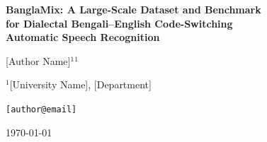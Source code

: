 \documentclass[a4paper,12pt]{article}
\begin{document}
\begin{titlepage}
\centering
\vspace*{2cm}

{\LARGE\bfseries
BanglaMix: A Large-Scale Dataset and Benchmark\\
for Dialectal Bengali--English Code-Switching\\
Automatic Speech Recognition
\par}

\vspace{1.5cm}

{\large
[Author Name]$^{1}$$^{1}$
\par}

\vspace{0.5cm}

{\normalsize
$^{1}$[University Name], [Department]\par
[City, Country]\par
\texttt{[author@email]}
\par}

\vspace{1cm}

{\small \today}

\vspace{2cm}

\begin{abstract}

\end{abstract}

\end{titlepage}

\tableofcontents
\newpage












\end{document}
